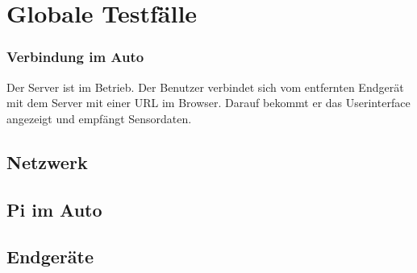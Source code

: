 \documentclass[pflichtenheft.tex]{subfiles}
\begin{document}
\chapter{Globale Testfälle}

\subsection{\mkt Verbindung im Auto}

 Der Server ist im Betrieb. Der Benutzer verbindet sich vom entfernten Endgerät mit dem Server mit einer URL im Browser. Darauf bekommt er das Userinterface angezeigt und empfängt Sensordaten.

\section{Netzwerk}
\section{Pi im Auto}
\section{Endgeräte}
\end{document}
